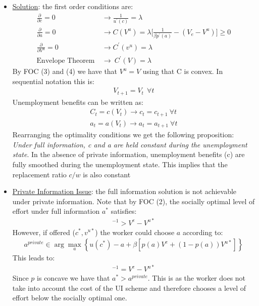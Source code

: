 \documentclass{article}
\begin{document}
\begin{itemize}
    \item  \underline{Solution}: the first order conditions are:
    \begin{align*}
        \frac{\partial}{\partial c} = 0 &\rightarrow \frac{1}{u^{'}(c)} = \lambda \tag{1} \\
        \frac{\partial}{\partial a} = 0 &\rightarrow C(V^{u}) = \lambda \big[\frac{1}{\beta p^{'}(a)} - (V_{e} - V^{u}) \big] \geq 0 \tag{2} \\
        \frac{\partial}{\partial V^{u}} = 0 &\rightarrow C^{'}(v^{u}) = \lambda \\
        \text{Envelope Theorem} \ &\rightarrow \ C^{'}(V) = \lambda
    \end{align*}
    By FOC (3) and (4) we have that $V^{u} = V$ using that C is convex. In sequential notation this is:
    \begin{gather*}
        V_{t+1} = V_{t} \ \ \forall t
    \end{gather*}
    Unemployment benefits can be written as:
    \begin{gather*}
        C_{t} = c(V_{t}) \rightarrow c_{t} = c_{t+1} \ \forall t \\
        a_{t} = a(V_{t}) \rightarrow a_{t} = a_{t+1} \ \forall t
    \end{gather*}
    Rearranging the optimality conditions we get the following proposition: \textit{Under full information, c and a are held constant during the unemployment state}. In the absence of private information, unemployment benefits (c) are fully smoothed during the unemployment state. This implies that the replacement ratio $c/w$ is also constant
    \item  \underline{Private Information Issue}: the full information solution is not achievable under private information. Note that by FOC (2), the socially optimal level of effort under full information $a^{*}$ satisfies:
    \begin{gather*}
        [\beta p^{'}(a^{*})]^{-1} > V^{e} - V^{u*}
    \end{gather*}
    However, if offered ($c^{*}, v^{u*}$) the worker could choose $a$ according to:
    \begin{gather*}
        a^{private} \in \arg \max_{a} \left\{ u(c^{*}) - a + \beta [p(a)V^{e} + (1-p(a))V^{u*}] \right\}
    \end{gather*}
    This leads to:
    \begin{gather*}
        [\beta p^{'} (a^{private})]^{-1} = V^{e} - V^{u*}
    \end{gather*}
    Since $p$ is concave we have that $a^{*} > a^{private}$. This is as the worker does not take into account the cost of the UI scheme and therefore chooses a level of effort below the socially optimal one.
\end{itemize}
\end{document}
